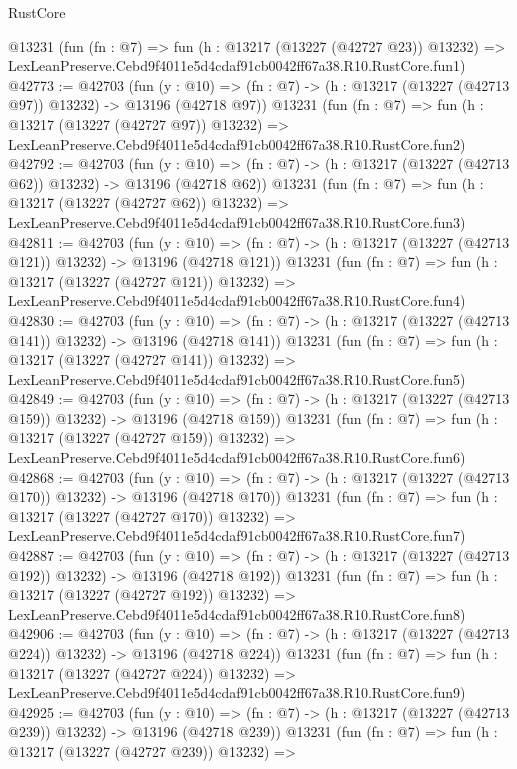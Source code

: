 \begin{lexlean}{RustCore}
\begin{coremodule}
    @13231
    (fun (fn : @7) =>
    fun (h : @13217 (@13227 (@42727 @23)) @13232) =>
    LexLeanPreserve.Cebd9f4011e5d4cdaf91cb0042ff67a38.R10.RustCore.fun1)
@42773 := @42703
    (fun (y : @10) => (fn : @7) -> (h : @13217 (@13227 (@42713 @97)) @13232) -> @13196 (@42718 @97))
    @13231
    (fun (fn : @7) =>
    fun (h : @13217 (@13227 (@42727 @97)) @13232) =>
    LexLeanPreserve.Cebd9f4011e5d4cdaf91cb0042ff67a38.R10.RustCore.fun2)
@42792 := @42703
    (fun (y : @10) => (fn : @7) -> (h : @13217 (@13227 (@42713 @62)) @13232) -> @13196 (@42718 @62))
    @13231
    (fun (fn : @7) =>
    fun (h : @13217 (@13227 (@42727 @62)) @13232) =>
    LexLeanPreserve.Cebd9f4011e5d4cdaf91cb0042ff67a38.R10.RustCore.fun3)
@42811 := @42703
    (fun (y : @10) =>
    (fn : @7) -> (h : @13217 (@13227 (@42713 @121)) @13232) -> @13196 (@42718 @121))
    @13231
    (fun (fn : @7) =>
    fun (h : @13217 (@13227 (@42727 @121)) @13232) =>
    LexLeanPreserve.Cebd9f4011e5d4cdaf91cb0042ff67a38.R10.RustCore.fun4)
@42830 := @42703
    (fun (y : @10) =>
    (fn : @7) -> (h : @13217 (@13227 (@42713 @141)) @13232) -> @13196 (@42718 @141))
    @13231
    (fun (fn : @7) =>
    fun (h : @13217 (@13227 (@42727 @141)) @13232) =>
    LexLeanPreserve.Cebd9f4011e5d4cdaf91cb0042ff67a38.R10.RustCore.fun5)
@42849 := @42703
    (fun (y : @10) =>
    (fn : @7) -> (h : @13217 (@13227 (@42713 @159)) @13232) -> @13196 (@42718 @159))
    @13231
    (fun (fn : @7) =>
    fun (h : @13217 (@13227 (@42727 @159)) @13232) =>
    LexLeanPreserve.Cebd9f4011e5d4cdaf91cb0042ff67a38.R10.RustCore.fun6)
@42868 := @42703
    (fun (y : @10) =>
    (fn : @7) -> (h : @13217 (@13227 (@42713 @170)) @13232) -> @13196 (@42718 @170))
    @13231
    (fun (fn : @7) =>
    fun (h : @13217 (@13227 (@42727 @170)) @13232) =>
    LexLeanPreserve.Cebd9f4011e5d4cdaf91cb0042ff67a38.R10.RustCore.fun7)
@42887 := @42703
    (fun (y : @10) =>
    (fn : @7) -> (h : @13217 (@13227 (@42713 @192)) @13232) -> @13196 (@42718 @192))
    @13231
    (fun (fn : @7) =>
    fun (h : @13217 (@13227 (@42727 @192)) @13232) =>
    LexLeanPreserve.Cebd9f4011e5d4cdaf91cb0042ff67a38.R10.RustCore.fun8)
@42906 := @42703
    (fun (y : @10) =>
    (fn : @7) -> (h : @13217 (@13227 (@42713 @224)) @13232) -> @13196 (@42718 @224))
    @13231
    (fun (fn : @7) =>
    fun (h : @13217 (@13227 (@42727 @224)) @13232) =>
    LexLeanPreserve.Cebd9f4011e5d4cdaf91cb0042ff67a38.R10.RustCore.fun9)
@42925 := @42703
    (fun (y : @10) =>
    (fn : @7) -> (h : @13217 (@13227 (@42713 @239)) @13232) -> @13196 (@42718 @239))
    @13231
    (fun (fn : @7) =>
    fun (h : @13217 (@13227 (@42727 @239)) @13232) =>

\end{coremodule}
\end{lexlean}
